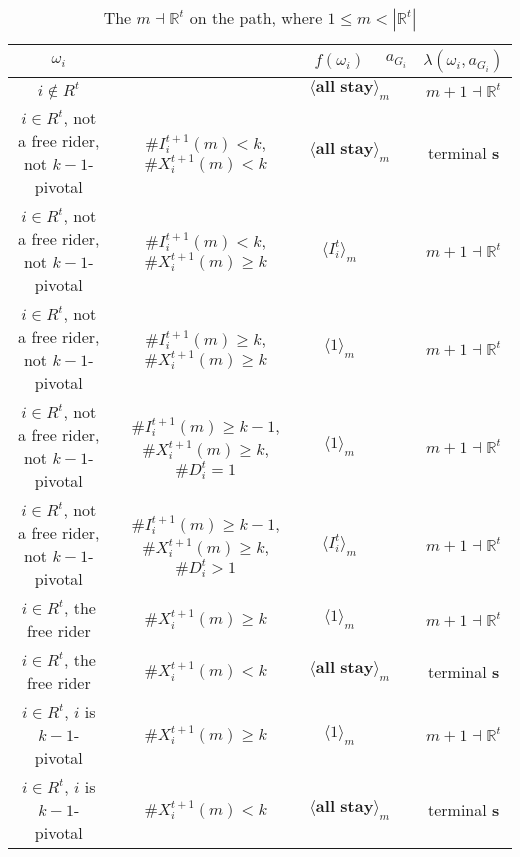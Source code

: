 \documentclass[12pt,letter]{article}
\newcommand{\Omicron}{\mathbb{R}}
\theoremstyle{definition}
\theoremstyle{definition}
\theoremstyle{remark}
\theoremstyle{claim}
\begin{document}
\begin{landscape}
\begin{table}[!htbp]
\caption{The $m\dashv\Omicron^t$ on the path, where $1\leq m < |\Omicron^t|$}
\label{table:eqm_path_ot1}
\begin{center}
\begin{tabular}{c c | c | c | c}
$\omega_i$ 	 & 	   &	$f(\omega_i)$  &	$a_{G_i}$ & $\lambda(\omega_i,a_{G_i})$ \\
\hline
\hline
$i\notin R^t$  	& 								& $\langle \textbf{all stay} \rangle_m$		&  			& $m+1\dashv \Omicron^t$ \\
$i\in R^t$, not a free rider, not $k-1$-pivotal		 	&  $\#I^{t+1}_i(m)< k$, $\#X^{t+1}_i(m)<k$			&  $\langle \textbf{all stay} \rangle_m$	& 	& terminal \textbf{s} \\
$i\in R^t$, not a free rider, not $k-1$-pivotal	  	& $\#I^{t+1}_i(m)<k$, $\#X^{t+1}_i(m)\geq k$		    & $\langle I^t_i \rangle_m$ 		&    			& $m+1\dashv \Omicron^t$ \\
$i\in R^t$, not a free rider, not $k-1$-pivotal	 	&  $\#I^{t+1}_i(m)\geq k$, $\#X^{t+1}_i(m)\geq k$	& $\langle 1 \rangle_m$ 	& 	& $m+1\dashv \Omicron^t$ \\
$i\in R^t$, not a free rider, not $k-1$-pivotal	 	&  $\#I^{t+1}_i(m)\geq k-1$, $\#X^{t+1}_i(m)\geq k$, $\#D^t_i=1$	& $\langle 1 \rangle_m$ 	& 	& $m+1\dashv \Omicron^t$ \\
$i\in R^t$, not a free rider, not $k-1$-pivotal	 	&  $\#I^{t+1}_i(m)\geq k-1$, $\#X^{t+1}_i(m)\geq k$, $\#D^t_i>1$	& $\langle I^t_i \rangle_m$ 	& 	& $m+1\dashv \Omicron^t$ \\
$i\in R^t$, the free rider  	&  $\#X^{t+1}_i(m)\geq k$ & $\langle 1 \rangle_m$ 		& 				  & $m+1\dashv \Omicron^t$ \\
$i\in R^t$, the free rider  	&  		$\#X^{t+1}_i(m)<k$					&  $\langle \textbf{all stay} \rangle_m$		& 										  & terminal \textbf{s} \\
$i\in R^t$, $i$ is $k-1$-pivotal  	&  $\#X^{t+1}_i(m)\geq k$ & $\langle 1 \rangle_m$ 	& 											 & $m+1\dashv \Omicron^t$ \\
$i\in R^t$, $i$ is $k-1$-pivotal  	&  	$\#X^{t+1}_i(m)<k$		&  $\langle \textbf{all stay} \rangle_m$	& 											 & terminal \textbf{s} \\
\hline
\end{tabular}
\end{center}
\end{table}


\end{landscape}
\end{document}
